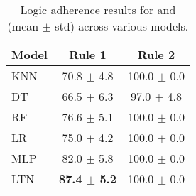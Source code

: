 \begin{table}
  \centering
  \begin{adjustbox}{max width=0.8\textwidth}
    \begin{tabular}{|l|c|c|}
      \hline
      \textbf{Model} & \textbf{Rule 1} & \textbf{Rule 2} \\
      \hline
      \gls{KNN}  & 70.8 $\pm$  4.8   & 100.0 $\pm$  0.0 \\
      \hline
      \gls{DT}   & 66.5 $\pm$  6.3   & 97.0 $\pm$  4.8 \\
      \hline
      \gls{RF}   & 76.6 $\pm$  5.1   & 100.0 $\pm$  0.0 \\
      \hline
      \gls{LR}   & 75.0 $\pm$  4.2   & 100.0 $\pm$  0.0 \\
      \hline
      \gls{MLP}  & 82.0 $\pm$  5.8   & 100.0 $\pm$  0.0 \\
      \hline
      \gls{LTN}  & \textbf{87.4 $\pm$  5.2 }  & 100.0 $\pm$  0.0 \\
      \hline
    \end{tabular}
  \end{adjustbox}
  \caption{
      Logic adherence results for  and  (mean $\pm$ std) across various models.
  }
  \label{tab:logic-adherence}
\end{table}